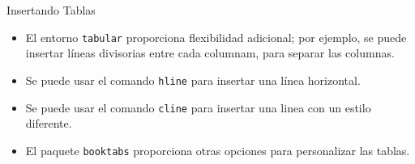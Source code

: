 \documentclass[12pt]{beamer}
\begin{document}
\begin{frame}{Insertando Tablas}
  \begin{itemize}
    \item<1-> El entorno \texttt{\color{blue}tabular} proporciona flexibilidad adicional; por ejemplo, se puede insertar líneas divisorias entre cada columnam, para separar las columnas.
    \item <2-> Se puede usar el comando \texttt{\color{blue}hline} para insertar una línea horizontal.
    \item <3-> Se puede usar el comando \texttt{\color{blue}cline} para insertar una linea con un estilo diferente.
    \item <4-> El paquete \texttt{\color{blue}booktabs} proporciona otras opciones para personalizar las tablas.
  \end{itemize}  
\end{frame}
\end{document}
